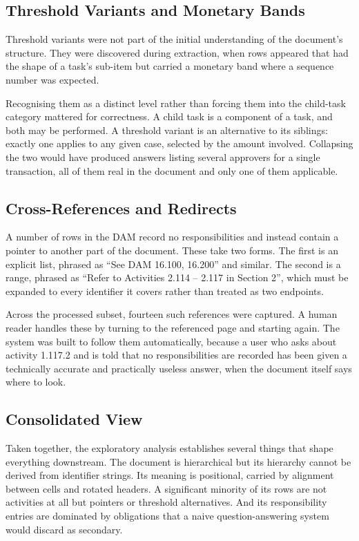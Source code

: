 \subsection{Threshold Variants and Monetary Bands}

Threshold variants were not part of the initial understanding of the document's structure. They were discovered during extraction, when rows appeared that had the shape of a task's sub-item but carried a monetary band where a sequence number was expected.

Recognising them as a distinct level rather than forcing them into the child-task category mattered for correctness. A child task is a component of a task, and both may be performed. A threshold variant is an alternative to its siblings: exactly one applies to any given case, selected by the amount involved. Collapsing the two would have produced answers listing several approvers for a single transaction, all of them real in the document and only one of them applicable.

\subsection{Cross-References and Redirects}

A number of rows in the DAM record no responsibilities and instead contain a pointer to another part of the document. These take two forms. The first is an explicit list, phrased as ``See DAM 16.100, 16.200'' and similar. The second is a range, phrased as ``Refer to Activities 2.114 -- 2.117 in Section 2'', which must be expanded to every identifier it covers rather than treated as two endpoints.

Across the processed subset, fourteen such references were captured. A human reader handles these by turning to the referenced page and starting again. The system was built to follow them automatically, because a user who asks about activity 1.117.2 and is told that no responsibilities are recorded has been given a technically accurate and practically useless answer, when the document itself says where to look.

\subsection{Consolidated View}

Taken together, the exploratory analysis establishes several things that shape everything downstream. The document is hierarchical but its hierarchy cannot be derived from identifier strings. Its meaning is positional, carried by alignment between cells and rotated headers. A significant minority of its rows are not activities at all but pointers or threshold alternatives. And its responsibility entries are dominated by obligations that a naive question-answering system would discard as secondary.

